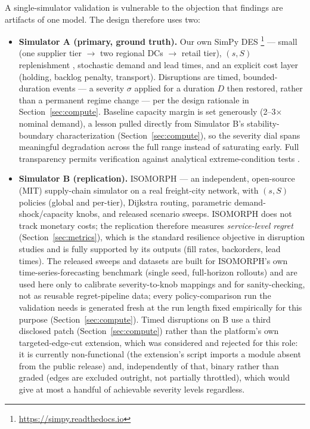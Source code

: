 \documentclass[12pt,a4paper]{article}
\begin{document}
A single-simulator validation is vulnerable to the objection that findings are artifacts of one model. The design therefore uses two:

\begin{itemize}
\item \textbf{Simulator A (primary, ground truth).} Our own SimPy DES \footnote{\url{https://simpy.readthedocs.io}} --- small (one supplier tier $\rightarrow$ two regional DCs $\rightarrow$ retail tier), $(s,S)$ replenishment \citep{law2015}, stochastic demand and lead times, and an explicit cost layer (holding, backlog penalty, transport). Disruptions are timed, bounded-duration events --- a severity $\sigma$ applied for a duration $D$ then restored, rather than a permanent regime change --- per the design rationale in Section~\ref{sec:compute}. Baseline capacity margin is set generously (2--3$\times$ nominal demand), a lesson pulled directly from Simulator B's stability-boundary characterization (Section~\ref{sec:compute}), so the severity dial spans meaningful degradation across the full range instead of saturating early. Full transparency permits verification against analytical extreme-condition tests \citep{law2015,kleijnen2015}.
\item \textbf{Simulator B (replication).} ISOMORPH \citep{zhang2026isomorph} --- an independent, open-source (MIT) supply-chain simulator on a real freight-city network, with $(s,S)$ policies (global and per-tier), Dijkstra routing, parametric demand-shock/capacity knobs, and released scenario sweeps. ISOMORPH does not track monetary costs; the replication therefore measures \emph{service-level regret} (Section~\ref{sec:metrics}), which is the standard resilience objective in disruption studies and is fully supported by its outputs (fill rates, backorders, lead times). The released sweeps and datasets are built for ISOMORPH's own time-series-forecasting benchmark (single seed, full-horizon rollouts) and are used here only to calibrate severity-to-knob mappings and for sanity-checking, not as reusable regret-pipeline data; every policy-comparison run the validation needs is generated fresh at the run length fixed empirically for this purpose (Section~\ref{sec:compute}). Timed disruptions on B use a third disclosed patch (Section~\ref{sec:compute}) rather than the platform's own targeted-edge-cut extension, which was considered and rejected for this role: it is currently non-functional (the extension's script imports a module absent from the public release) and, independently of that, binary rather than graded (edges are excluded outright, not partially throttled), which would give at most a handful of achievable severity levels regardless.
\end{itemize}
\end{document}
